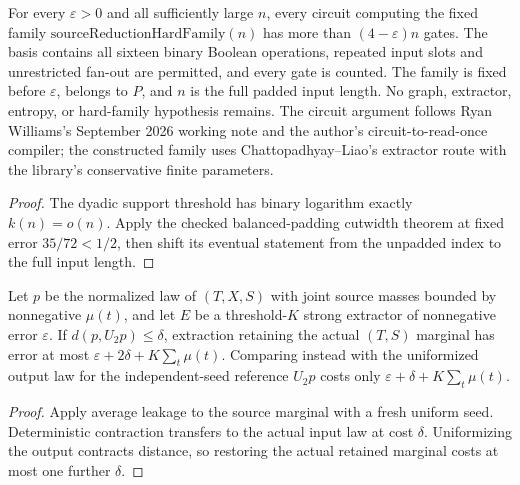 \begin{theorem}
  \label{thm:lowerbounds-algebraic-explicit-four-n}
  \leanok
  For every $\varepsilon>0$ and all sufficiently large $n$, every
  circuit computing the fixed family
  $\mathrm{sourceReductionHardFamily}(n)$ has more than
  $(4-\varepsilon)n$ gates. The basis contains all sixteen binary
  Boolean operations, repeated input slots and unrestricted fan-out
  are permitted, and every gate is counted. The family is fixed before
  $\varepsilon$, belongs to $P$, and $n$ is the full padded input length.
  No graph, extractor, entropy, or hard-family hypothesis remains.
  The circuit argument follows Ryan Williams's September 2026 working
  note and the author's circuit-to-read-once compiler; the constructed
  family uses Chattopadhyay--Liao's extractor route with the library's
  conservative finite parameters.
\end{theorem}
\begin{proof}
  \leanok
  The dyadic support threshold has binary logarithm exactly $k(n)=o(n)$.
  Apply the checked balanced-padding cutwidth theorem at fixed error
  $35/72<1/2$, then shift its eventual statement from the unpadded index
  to the full input length.
\end{proof}



\begin{theorem}
  \label{thm:lowerbounds-algebraic-perturbed-seed}
  \leanok
  Let $p$ be the normalized law of $(T,X,S)$ with joint source masses
  bounded by nonnegative $\mu(t)$, and let $E$ be a threshold-$K$ strong
  extractor of nonnegative error $\varepsilon$. If
  $d(p,U_2p)\le\delta$, extraction retaining the actual $(T,S)$ marginal
  has error at most $\varepsilon+2\delta+K\sum_t\mu(t)$.
  Comparing instead with the uniformized output law for the independent-seed
  reference $U_2p$ costs only $\varepsilon+\delta+K\sum_t\mu(t)$.
\end{theorem}
\begin{proof}
  \leanok
  Apply average leakage to the source marginal with a fresh uniform seed.
  Deterministic contraction transfers to the actual input law at cost
  $\delta$. Uniformizing the output contracts distance, so restoring the
  actual retained marginal costs at most one further $\delta$.
\end{proof}


